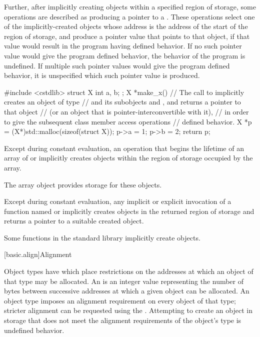 \pnum
Further, after implicitly creating objects within a specified region of storage,
some operations are described as producing a pointer to a
.
These operations select one of the implicitly-created objects
whose address is the address of the start of the region of storage,
and produce a pointer value that points to that object,
if that value would result in the program having defined behavior.
If no such pointer value would give the program defined behavior,
the behavior of the program is undefined.
If multiple such pointer values would give the program defined behavior,
it is unspecified which such pointer value is produced.

\pnum
\begin{example}
\begin{codeblock}
#include <cstdlib>
struct X { int a, b; };
X *make_x() {
  // The call to  implicitly creates an object of type 
  // and its subobjects  and , and returns a pointer to that  object
  // (or an object that is pointer-interconvertible with it),
  // in order to give the subsequent class member access operations
  // defined behavior.
  X *p = (X*)std::malloc(sizeof(struct X));
  p->a = 1;
  p->b = 2;
  return p;
}
\end{codeblock}
\end{example}

\pnum
Except during constant evaluation,
an operation that begins the lifetime of
an array of  or 
implicitly creates objects within the region of storage occupied by the array.
\begin{note}
The array object provides storage for these objects.
\end{note}
Except during constant evaluation,
any implicit or explicit invocation of a function
named  or 
implicitly creates objects in the returned region of storage and
returns a pointer to a suitable created object.
\begin{note}
Some functions in the \Cpp{} standard library implicitly create
objects.
\end{note}

[basic.align]{Alignment}

\pnum
Object types have 
which place restrictions on the addresses at which an object of that type
may be allocated. An  is an 
integer value representing the number of bytes between successive addresses
at which a given object can be allocated. An object type imposes an alignment
requirement on every object of that type; stricter alignment can be requested
using the .
Attempting to create an object in storage that
does not meet the alignment requirements of the object's type
is undefined behavior.

